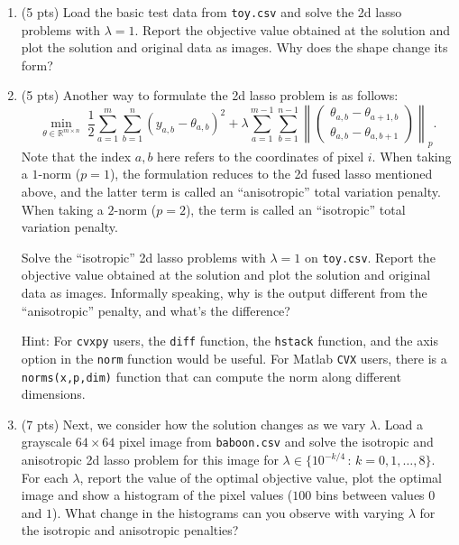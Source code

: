 \documentclass{article}
\theoremstyle{remark}
\theoremstyle{definition}
\begin{document}
\begin{enumerate}
\item (5 pts) Load the basic test data from \texttt{toy.csv} and solve the 2d lasso problems
with $\lambda = 1$. Report the objective value obtained at the solution and plot
the solution and original data as images. Why does the shape change its form?

\item (5 pts) Another way to formulate the 2d lasso problem is as follows:
$$ \min_{\theta\in\mathbb{R}^{m\times n}} \; \frac{1}{2} \sum_{a=1}^m\sum_{b=1}^n(y_{a,b} - \theta_{a,b})^2 +
\lambda \sum_{a=1}^{m-1}\sum_{b=1}^{n-1}\left\|\begin{pmatrix}\theta_{a,b}-\theta_{a+1,b}\\ \theta_{a,b}-\theta_{a,b+1}\end{pmatrix}\right\|_p.$$
Note that the index $a,b$ here refers to the coordinates of pixel $i$.
When taking a $1$-norm ($p=1$), the formulation reduces to the 2d fused lasso mentioned above, 
and the latter term is called an ``anisotropic'' total variation penalty.
When taking a $2$-norm ($p=2$), the term is called an ``isotropic'' total variation penalty.

Solve the ``isotropic'' 2d lasso problems with $\lambda = 1$ on \texttt{toy.csv}.
Report the objective value obtained at the solution and plot
the solution and original data as images.  Informally speaking, why is the output different from the ``anisotropic'' penalty, and what's the difference?

Hint: For \texttt{cvxpy} users, the \texttt{diff} function, the \texttt{hstack} function, and the axis option in the \texttt{norm} function would be useful.
For Matlab \texttt{CVX} users, there is a \texttt{norms(x,p,dim)} function that can compute the norm along different dimensions.

\item (7 pts) Next, we consider how the solution changes as we vary $\lambda$. Load a grayscale $64 \times 64$ pixel image from \texttt{baboon.csv} and solve the isotropic and anisotropic 
2d lasso problem for this image for $\lambda \in \{ 10^{-k/4} \, : \,
        k=0, 1, \dots, 8 \}$.  For each $\lambda$, report the value of the
        optimal objective value, plot the optimal image and show a histogram of
        the pixel values ($100$ bins between values $0$ and $1$). 
        What change in the histograms can you observe with varying $\lambda$ for the isotropic and anisotropic penalties?
\end{enumerate}
\end{document}
